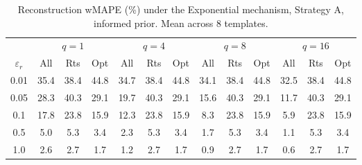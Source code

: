 \begin{table}[h]
\centering
\setlength{\tabcolsep}{2.5pt}
\small
\caption{Reconstruction wMAPE (\%) under the Exponential mechanism, Strategy A, informed prior. Mean across 8 templates.}
\label{tab:rq2_exp_A_informed}
\begin{tabular}{c|ccc|ccc|ccc|ccc}
\toprule
 & \multicolumn{3}{c|}{$q=1$} & \multicolumn{3}{c|}{$q=4$} & \multicolumn{3}{c|}{$q=8$} & \multicolumn{3}{c}{$q=16$} \\
$\varepsilon_r$ & All & Rts & Opt & All & Rts & Opt & All & Rts & Opt & All & Rts & Opt \\
\midrule
0.01 & 35.4 & 38.4 & 44.8 & 34.7 & 38.4 & 44.8 & 34.1 & 38.4 & 44.8 & 32.5 & 38.4 & 44.8 \\
0.05 & 28.3 & 40.3 & 29.1 & 19.7 & 40.3 & 29.1 & 15.6 & 40.3 & 29.1 & 11.7 & 40.3 & 29.1 \\
0.1 & 17.8 & 23.8 & 15.9 & 12.3 & 23.8 & 15.9 & 8.3 & 23.8 & 15.9 & 5.9 & 23.8 & 15.9 \\
0.5 & 5.0 & 5.3 & 3.4 & 2.3 & 5.3 & 3.4 & 1.7 & 5.3 & 3.4 & 1.1 & 5.3 & 3.4 \\
1.0 & 2.6 & 2.7 & 1.7 & 1.2 & 2.7 & 1.7 & 0.9 & 2.7 & 1.7 & 0.6 & 2.7 & 1.7 \\
\bottomrule
\end{tabular}
\end{table}
